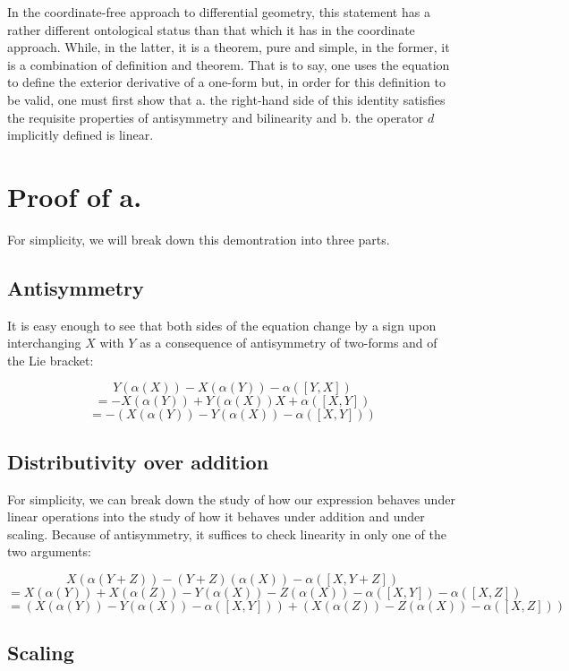 \documentclass[12pt]{article}
\begin{document}
In the coordinate-free approach to differential geometry, this statement has a rather different ontological status than that which it has in the coordinate approach.  While, in the latter, it is a theorem, pure and simple, in the former, it is a combination of definition and theorem.  That is to say, one uses the equation to define the exterior derivative of a one-form but, in order for this definition to be valid, one must first show that a. the right-hand side of this identity satisfies the requisite properties of antisymmetry and bilinearity  and b. the operator $d$ implicitly defined is linear.

\section{Proof of a.}

For simplicity, we will break down this demontration into three parts.

\subsection{Antisymmetry}

It is easy enough to see that both sides of the equation change by a sign upon interchanging $X$ with $Y$ as a consequence of antisymmetry of two-forms and of the Lie bracket:

\[ Y(\alpha(X)) - X(\alpha(Y))  - \alpha([Y,X]) \]
\[ = - X(\alpha(Y)) + Y(\alpha(X)) X  + \alpha([X,Y]) \]
\[ = -(X(\alpha(Y)) - Y(\alpha(X))  - \alpha([X,Y])) \]

\subsection{Distributivity over addition}
For simplicity, we can break down the study of how our expression behaves under linear operations into the study of how it behaves under addition and under scaling.  Because of antisymmetry, it suffices to check linearity in only one of the two arguments:

\[  X(\alpha(Y+Z)) - (Y+Z)(\alpha(X))  - \alpha([X,Y+Z]) \]
\[ = X(\alpha(Y)) + X(\alpha(Z)) - Y(\alpha(X)) - Z(\alpha(X)) - \alpha([X,Y]) - \alpha([X,Z]) \]
\[ = (X(\alpha(Y)) - Y(\alpha(X)) - \alpha([X,Y])) + (X(\alpha(Z)) - Z(\alpha(X)) - \alpha([X,Z])) \]

\subsection{Scaling}
\end{document}
